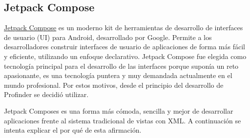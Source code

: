 \subsection{Jetpack Compose}\hypertarget{subsec:compose}{}
\href{https://developer.android.com/develop/ui/compose}{Jetpack Compose} es un moderno kit de herramientas de desarrollo de interfaces de usuario (UI) para Android, desarrollado por Google. Permite a los desarrolladores construir interfaces de usuario de aplicaciones de forma más fácil y eficiente, utilizando un enfoque declarativo. Jetpack Compose fue elegida como tecnología principal para el desarrollo de las interfaces porque suponía un reto apasionante, es una tecnología puntera y muy demandada actualmente en el mundo profesional. Por estos motivos, desde el principio del desarrollo de Profinder se decidió utilizar. 

Jetpack Composes es una forma más cómoda, sencilla y mejor de desarrollar aplicaciones frente al sistema tradicional de vistas con XML. A continuación se intenta explicar el por qué de esta afirmación.
